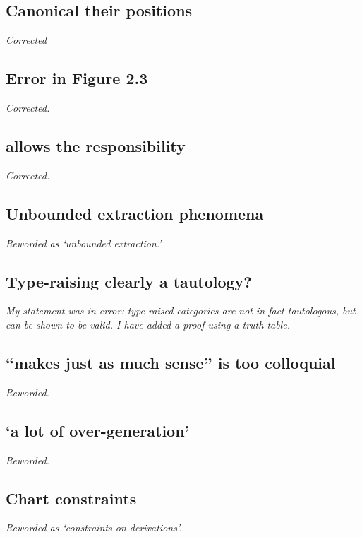 \subsection{Canonical their positions}

\emph{Corrected}

\subsection{Error in Figure 2.3}

\emph{Corrected.}

\subsection{allows the responsibility}

\emph{Corrected.}

\subsection{Unbounded extraction phenomena}

\emph{Reworded as `unbounded extraction.'}

\subsection{Type-raising clearly a tautology?}

\emph{My statement was in error: type-raised categories are not in fact
tautologous, but
can be shown to be valid. I have added a proof using a truth
table.}

\subsection{``makes just as much sense'' is too colloquial}

\emph{Reworded.}

\subsection{`a lot of over-generation'}

\emph{Reworded.}

\subsection{Chart constraints}

\emph{Reworded as `constraints on derivations'.}

